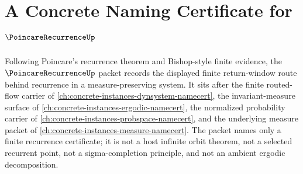 \chapter{A Concrete Naming Certificate for $\PoincareRecurrenceUp$}
\label{ch:concrete-instances-poincare-recurrence-namecert}

Following Poincare's recurrence theorem and Bishop-style finite evidence, the $\PoincareRecurrenceUp$ packet records the displayed finite return-window route behind recurrence in a measure-preserving system. It sits after the finite routed-flow carrier of \autoref{ch:concrete-instances-dynsystem-namecert}, the invariant-measure surface of \autoref{ch:concrete-instances-ergodic-namecert}, the normalized probability carrier of \autoref{ch:concrete-instances-probspace-namecert}, and the underlying measure packet of \autoref{ch:concrete-instances-measure-namecert}. The packet names only a finite recurrence certificate; it is not a host infinite orbit theorem, not a selected recurrent point, not a sigma-completion principle, and not an ambient ergodic decomposition.

